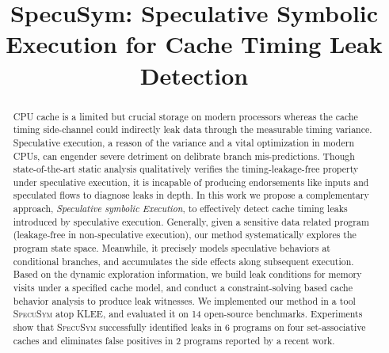 \documentclass[sigconf, review]{acmart}
\newcommand\ignore[1]{}
\newcommand{\SpecuSym}{\textsc{SpecuSym} }
\begin{document}
\setlength{\abovedisplayskip}{3pt}
\setlength{\belowdisplayskip}{3pt}

\title[]{SpecuSym: Speculative Symbolic Execution for Cache Timing Leak Detection}

\ignore{
  \author{xxx}
  \affiliation{%
    \institution{Baidu X-Lab}
    \city{Sunnyvale}
    \state{CA}
    \postcode{95134}
  }
}



\begin{abstract}
  CPU cache is a limited but crucial storage on modern processors whereas the 
  cache timing side-channel could indirectly leak data through the measurable 
  timing variance. Speculative execution, a reason of the variance and a vital 
  optimization in modern CPUs, can engender severe detriment on delibrate branch 
  mis-predictions.
  Though state-of-the-art static analysis qualitatively verifies the 
	timing-leakage-free property under speculative execution, it is incapable 
  of producing endorsements like inputs and speculated flows to diagnose 
  leaks in depth. 
	In this work we propose a complementary approach, \textit{Speculative symbolic 
  Execution}, to effectively detect cache timing leaks introduced by speculative 
  execution. Generally, given a sensitive data related program 
  (leakage-free in non-speculative execution), our method systematically explores 
  the program state space. Meanwhile, it precisely models speculative behaviors 
  at conditional branches, and accumulates the side effects along subsequent 
  execution. Based on the dynamic exploration information, we build leak conditions 
  for memory visits under a specified cache model, and conduct a constraint-solving 
  based cache behavior analysis to produce leak witnesses.
  We implemented our method in a tool \SpecuSym atop KLEE, and evaluated 
  it on 14 open-source benchmarks. Experiments show that \SpecuSym successfully
  identified leaks in 6 programs on four set-associative caches and eliminates 
  false positives in 2 programs reported by a recent work.
\end{abstract}

\maketitle
\end{document}
